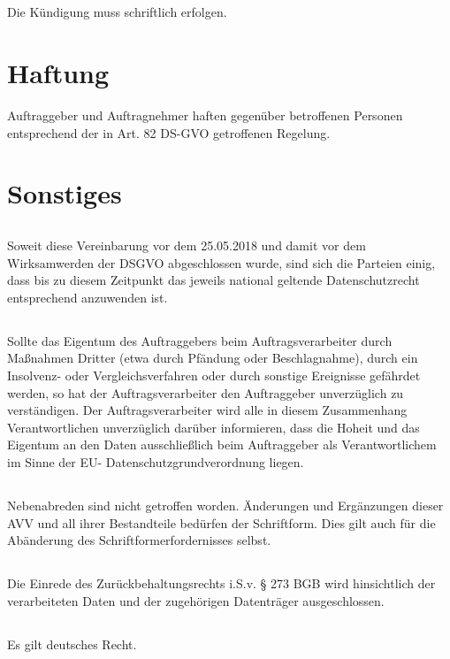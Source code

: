 \documentclass[10pt]{article}
\begin{document}
\subsection{} Die Kündigung muss schriftlich erfolgen.
\section{Haftung}
Auftraggeber und Auftragnehmer haften gegenüber betroffenen Personen entsprechend der
in Art. 82 DS-GVO getroffenen Regelung.
\section{Sonstiges}
\subsection{} Soweit diese Vereinbarung vor dem 25.05.2018 und damit vor dem Wirksamwerden
der DSGVO abgeschlossen wurde, sind sich die Parteien einig, dass bis zu diesem
Zeitpunkt das jeweils national geltende Datenschutzrecht entsprechend anzuwenden
ist.
\subsection{} Sollte das Eigentum des Auftraggebers beim Auftragsverarbeiter durch Maßnahmen
Dritter (etwa durch Pfändung oder Beschlagnahme), durch ein Insolvenz- oder
Vergleichsverfahren oder durch sonstige Ereignisse gefährdet werden, so hat der
Auftragsverarbeiter den Auftraggeber unverzüglich zu verständigen. Der
Auftragsverarbeiter wird alle in diesem Zusammenhang Verantwortlichen
unverzüglich darüber informieren, dass die Hoheit und das Eigentum an den Daten
ausschließlich beim Auftraggeber als Verantwortlichem im Sinne der EU-
Datenschutzgrundverordnung liegen.
\subsection{} Nebenabreden sind nicht getroffen worden. Änderungen und Ergänzungen dieser
AVV und all ihrer Bestandteile bedürfen der Schriftform. Dies gilt auch für die
Abänderung des Schriftformerfordernisses selbst.
\subsection{} Die Einrede des Zurückbehaltungsrechts i.S.v. § 273 BGB wird hinsichtlich der
verarbeiteten Daten und der zugehörigen Datenträger ausgeschlossen.
\subsection{} Es gilt deutsches Recht.
\end{document}

